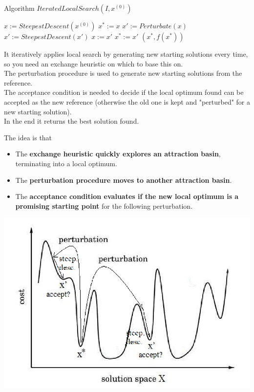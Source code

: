 \begin{algorithm}
	\caption{Algorithm $IteratedLocalSearch(I , x^{(0)})$}
	\begin{algorithmic}
		\STATE $x := SteepestDescent(x^{(0)})$
		\STATE $x^\ast := x$
		\STATE $x' := Perturbate(x)$
		\STATE $x' := SteepestDescent(x')$
		\STATE $x := x'$
		\ENDIF
		\STATE $x^\ast := x'$
		\ENDIF
		\ENDFOR
		\RETURN $(x^\ast, f (x^\ast))$
	\end{algorithmic}
\end{algorithm}

It iteratively applies local search by generating new starting solutions every time, so you need an exchange heuristic on which to base this on.\\

The perturbation procedure is used to generate new starting solutions from the reference.\\

The acceptance condition is needed to decide if the local optimum found can be accepted as the new reference (otherwise the old one is kept and "perturbed" for a new starting solution).\\

In the end it returns the best solution found.

\newpage

The idea is that
\begin{itemize}
	\item The \textbf{exchange heuristic quickly explores an attraction basin}, terminating into a local optimum.
	
	\item The \textbf{perturbation procedure moves to another attraction basin}.
	
	\item The \textbf{acceptance condition evaluates if the new local optimum is a promising starting point} for the following perturbation.
\end{itemize}

\begin{center}
	\includegraphics[width=0.7\columnwidth]{img/ILS1}
\end{center}

